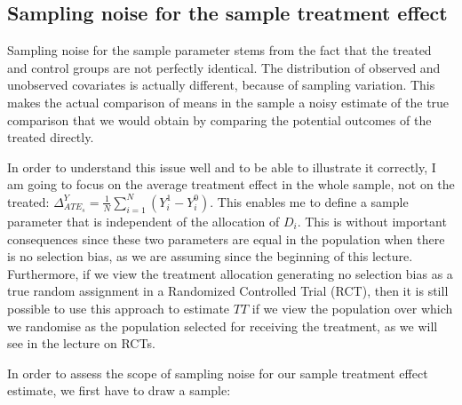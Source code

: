 \documentclass[]{book}
\theoremstyle{definition}
\theoremstyle{definition}
\theoremstyle{definition}
\theoremstyle{remark}
\let\BeginKnitrBlock\begin \let\EndKnitrBlock\end
\begin{document}
\hypertarget{sec:illusnoisesamp}{%
\subsection{Sampling noise for the sample treatment effect}\label{sec:illusnoisesamp}}

Sampling noise for the sample parameter stems from the fact that the treated and control groups are not perfectly identical.
The distribution of observed and unobserved covariates is actually different, because of sampling variation.
This makes the actual comparison of means in the sample a noisy estimate of the true comparison that we would obtain by comparing the potential outcomes of the treated directly.

In order to understand this issue well and to be able to illustrate it correctly, I am going to focus on the average treatment effect in the whole sample, not on the treated: \(\Delta^Y_{ATE_s}=\frac{1}{N}\sum_{i=1}^N(Y_i^1-Y_i^0)\).
This enables me to define a sample parameter that is independent of the allocation of \(D_i\).
This is without important consequences since these two parameters are equal in the population when there is no selection bias, as we are assuming since the beginning of this lecture.
Furthermore, if we view the treatment allocation generating no selection bias as a true random assignment in a Randomized Controlled Trial (RCT), then it is still possible to use this approach to estimate \(TT\) if we view the population over which we randomise as the population selected for receiving the treatment, as we will see in the lecture on RCTs.

\BeginKnitrBlock{example}
\protect\hypertarget{exm:unnamed-chunk-34}{}{\label{exm:unnamed-chunk-34} }In order to assess the scope of sampling noise for our sample treatment effect estimate, we first have to draw a sample:
\EndKnitrBlock{example}
\end{document}

